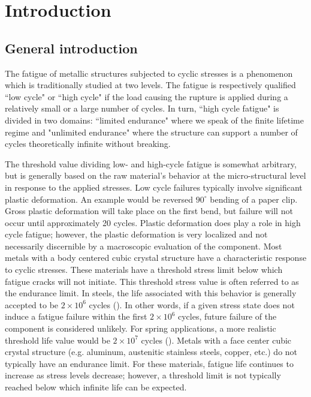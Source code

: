 \chapter{Introduction} \label{chp:1}
\minitoc

\section{General introduction}
The fatigue of metallic structures subjected to cyclic stresses is a phenomenon
which is traditionally studied at two levels. The fatigue is respectively qualified
``low cycle" or ``high cycle" if the load causing the rupture is applied
during a relatively small or a large number of cycles. In turn, ``high cycle fatigue" is divided
in two domains: ``limited endurance" where we speak of the finite lifetime regime
and "unlimited endurance" where the structure can support a number of cycles theoretically
infinite without breaking. 

The threshold value dividing low- and high-cycle fatigue is somewhat arbitrary, but is generally
based on the raw material’s behavior at the micro-structural level in response to the applied stresses. Low cycle
failures typically involve significant plastic deformation. An example would be reversed $90^{\circ}$ bending
of a paper clip. Gross plastic deformation will take place on the first bend, but failure will not occur until
approximately 20 cycles. Plastic deformation does play a role in high cycle fatigue; however, the plastic
deformation is very localized and not necessarily discernible by a macroscopic evaluation of the
component. Most metals with a body centered cubic crystal structure have a characteristic response to cyclic stresses.
These materials have a threshold stress limit below which fatigue cracks will not initiate. This threshold
stress value is often referred to as the endurance limit. In steels, the life associated with this behavior is
generally accepted to be $2\times10^6$ cycles (\cite{stone2012fatigue}). In other words, if a given stress state does not induce a fatigue failure within the first $2\times10^6$ cycles, future failure of the component is considered unlikely. For spring
applications, a more realistic threshold life value would be $2\times10^7$ cycles (\cite{stone2012fatigue}). Metals with a face center cubic crystal structure (e.g. aluminum, austenitic stainless steels, copper, etc.) do not typically have an endurance
limit. For these materials, fatigue life continues to increase as stress levels decrease; however, a threshold
limit is not typically reached below which infinite life can be expected.

